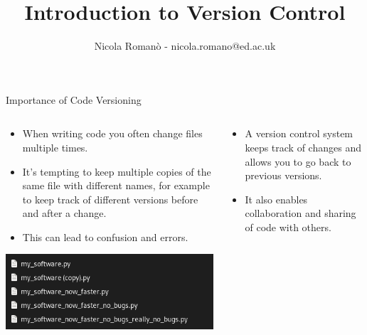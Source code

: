 \documentclass[9pt, aspectratio=169]{beamer}
\author{Nicola Roman\`o - nicola.romano@ed.ac.uk}
\title{Introduction to Version Control}
\date{}
\begin{document}

\begin{frame}
    \titlepage
\end{frame}

\begin{frame}
    {Importance of Code Versioning}
    \begin{columns}[T]
        \begin{column}{.5\textwidth}
            \begin{itemize}
                \item When writing code you often change files multiple times.
                \item It's tempting to keep multiple copies of the same file with different names, for example to keep track of different versions before and after a change.
                \item This can lead to confusion and errors.
            \end{itemize}
            \includegraphics[width=\textwidth]{messy_filenames.png}
        \end{column}
        \pause
        \begin{column}{.5\textwidth}
            \begin{itemize}
                \item A version control system keeps track of changes and allows you to go back to previous versions.
                \item It also enables collaboration and sharing of code with others.
            \end{itemize}
            \centering

\end{column}
\end{columns}
\end{frame}
\end{document}
